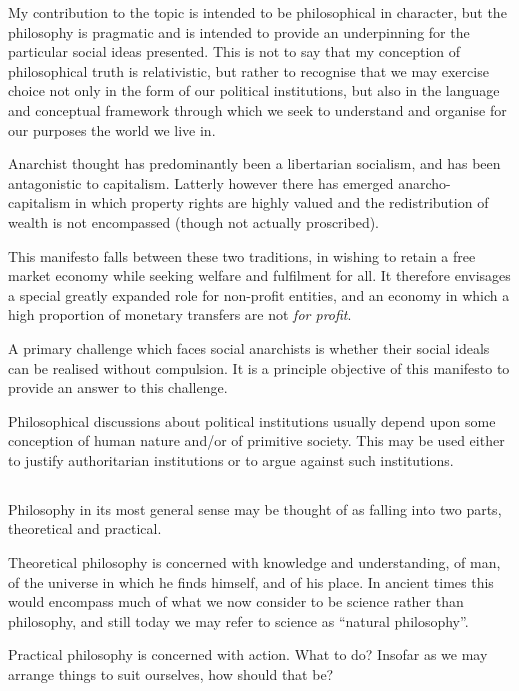 My contribution to the topic is intended to be philosophical in character, but the philosophy is pragmatic and is intended to provide an underpinning for the particular social ideas presented.
This is not to say that my conception of philosophical truth is relativistic, but rather to recognise that we may exercise choice not only in the form of our political institutions, but also in the language and conceptual framework through which we seek to understand and organise for our purposes the world we live in.

Anarchist thought has predominantly been a libertarian socialism, and has been antagonistic to capitalism.
Latterly however there has emerged anarcho-capitalism in which property rights are highly valued and the redistribution of wealth is not encompassed (though not actually proscribed).

This manifesto falls between these two traditions, in wishing to retain a free market economy while seeking welfare and fulfilment for all.
It therefore envisages a special greatly expanded role for non-profit entities, and an economy in which a high proportion of monetary transfers are not {\it for profit}.

A primary challenge which faces social anarchists is whether their social ideals can be realised without compulsion.
It is a principle objective of this manifesto to provide an answer to this challenge.

Philosophical discussions about political institutions usually depend upon some conception of human nature and/or of primitive society.
This may be used either to justify authoritarian institutions or to argue against such institutions.

\subsection{}

Philosophy in its most general sense may be thought of as falling into two parts, theoretical and practical.

Theoretical philosophy is concerned with knowledge and understanding, of man, of the universe in which he finds himself, and of his place.
In ancient times this would encompass much of what we now consider to be science rather than philosophy, and still today we may refer to science as ``natural philosophy''.

Practical philosophy is concerned with action.
What to do?
Insofar as we may arrange things to suit ourselves, how should that be?

